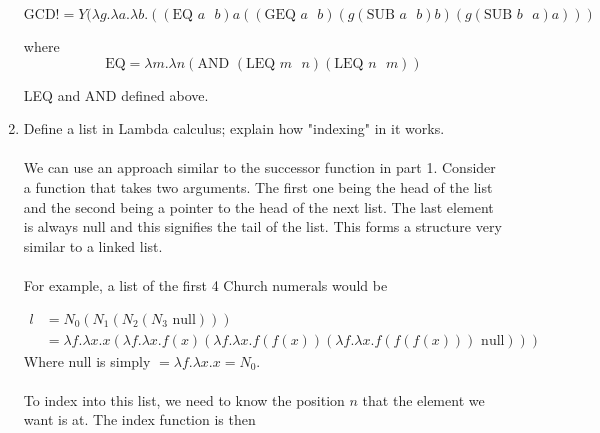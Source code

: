 \documentclass{article}
\begin{document}
\begin{enumerate}
    \[\text{GCD} != Y (\lambda g.\lambda a.\lambda b.((\text{EQ } a \text{ } b) a ((\text{GEQ } a \text{ } b) (g (\text{SUB } a \text{ } b) b)(g (\text{SUB } b \text{ } a) a)))\]

    where
    \[\text{EQ} = \lambda m.\lambda n(\text{AND }(\text{LEQ } m\text{ } n)(\text{LEQ } n \text{ } m))\]

    LEQ and AND defined above.



    \color{black}
    \item Define a list in Lambda calculus; explain how "indexing" in it works.\\
    \\
    \color{blue}
    We can use an approach similar to the successor function in part 1. Consider a function that takes two arguments. The first one being the head of the list and the second being a pointer to the head of the next list. The last element is always null and this signifies the tail of the list. This forms a structure very similar to a linked list.\\
    \\
    For example, a list of the first 4 Church numerals would be

    \begin{align}
        l&= N_0 (N_1 (N_2 (N_3 \text{ null}))) \\
        &= \lambda f.\lambda x.x(\lambda f.\lambda x.f(x)(\lambda f.\lambda x.f(f(x))(\lambda f.\lambda x.f(f(f(x))) \text{ null})))
    \end{align}
    Where null is simply \(= \lambda f.\lambda x.x = N_0\).\\
    \\
    To index into this list, we need to know the position \(n\) that the element we want is at. The index function is then


\end{enumerate}
\end{document}
